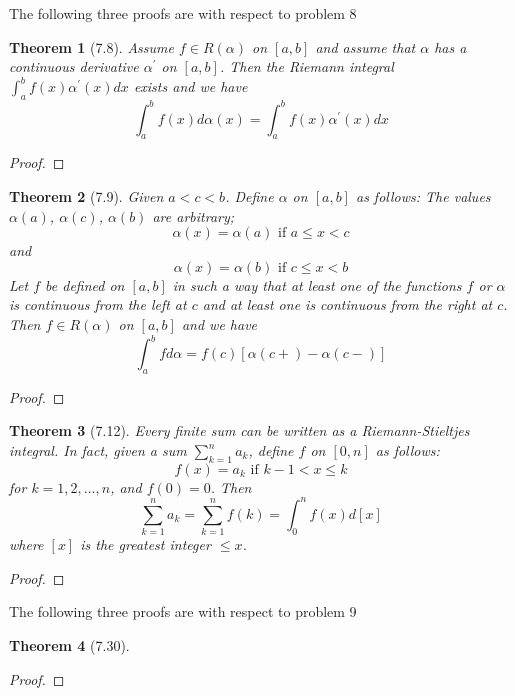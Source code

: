 \documentclass[aps,pra,notitlepage,amsmath,amssymb,letterpaper,12pt]{revtex4-1}
\newtheorem{theorem}{Theorem}
\begin{document}
The following three proofs are with respect to problem 8
\begin{theorem}[7.8]
Assume $f \in R(\alpha)$ on $[a,b]$ and assume that $\alpha$ has a continuous derivative $\alpha^\prime$ on $[a,b]$. Then the Riemann integral $\int_{a}^{b} f(x) \alpha^\prime(x)dx$ exists and we have
\[\int_{a}^{b} f(x) d\alpha(x) = \int_{a}^{b} f(x) \alpha^\prime(x)dx\]
\end{theorem}
\begin{proof}
\end{proof}

\begin{theorem}[7.9]
Given $a < c < b$. Define $\alpha$ on $[a,b]$ as follows: The values $\alpha(a)$, $\alpha(c)$, $\alpha(b)$ are arbitrary;
\[\alpha(x) = \alpha(a) \textrm{ if } a \leq x < c\]
and
\[\alpha(x) = \alpha(b) \textrm{ if } c \leq x < b\]
Let $f$ be defined on $[a,b]$ in such a way that at least one of the functions $f$ or $\alpha$ is continuous from the left at $c$ and at least one is continuous from the right at $c$. Then $f \in R(\alpha)$ on $[a,b]$ and we have
\[\int_{a}^{b} f d\alpha = f(c)[\alpha(c+) - \alpha(c-)]\]
\end{theorem}
\begin{proof}
\end{proof}

\begin{theorem}[7.12]
Every finite sum can be written as a Riemann-Stieltjes integral. In fact, given a sum $\sum_{k=1}^{n} a_{k}$, define $f$ on $[0,n]$ as follows:
\[f(x) = a_{k}  \textrm{  if  }  k-1 < x \leq k\]
for $k=1,2,...,n$, and $f(0) = 0$. Then
\[\sum_{k=1}^{n}a_{k} = \sum_{k=1}^{n}f(k) = \int_{0}^{n}f(x)d[x]\]
where $[x]$ is the greatest integer $\leq x$.
\end{theorem}
\begin{proof}
\end{proof}

The following three proofs are with respect to problem 9
\begin{theorem}[7.30]
\end{theorem}
\begin{proof}
\end{proof}
\end{document}
